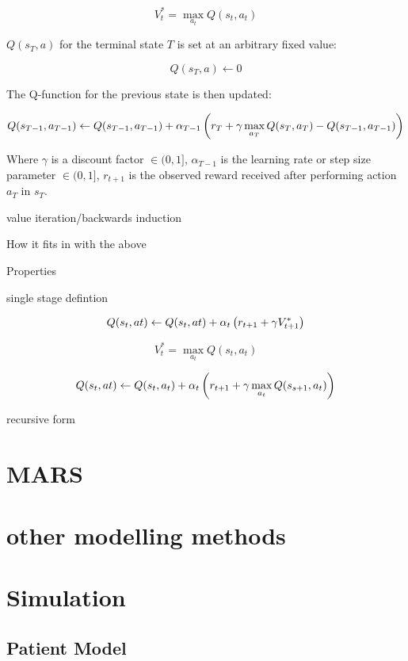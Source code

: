 \documentclass[12pt]{article}
\begin{document}
\[
  V^{*}_{t} = \max_{a_{t}} Q(s_{t}, a_{t})
\]

$Q(s_{T}, a)$ for the terminal state $T$ is set at an arbitrary fixed value:

\[
  Q(s_{T}, a) \gets 0
\]

The Q-function for the previous state is then updated:

\[
Q(s_{T-1}, a_{T-1}) \gets Q(s_{T-1}, a_{T-1}) + \alpha_{T-1} \del{r_{T} + \gamma  \max_{a_{T}} Q(s_{T}, a_{T}) - Q(s_{T-1}, a_{T-1})}
\]

Where $\gamma$ is a discount factor $\in (0, 1]$, $\alpha_{T-1}$ is the learning rate or step size parameter $\in (0, 1]$, $r_{t+1}$ is the observed reward received after performing action $a_{T}$ in $s_{T}$. 

value iteration/backwards induction

How it fits in with the above

Properties

single stage defintion

\[
Q(s_{t}, a{t}) \gets Q(s_{t}, a{t}) + \alpha_{t} \del{r_{t+1} + \gamma V^{*}_{t + 1}}
\]

\[
V^{*}_{t} = \max_{a_{t}} Q(s_{t}, a_{t})
\]

\[
Q(s_{t}, a{t}) \gets Q(s_{t}, a_{t}) + \alpha_{t} \del{r_{t+1} + \gamma \max_{a_{t}} Q(s_{s + 1}, a_{t})}
\]

recursive form




\section{MARS} %
\label{sec:mars}


\section{other modelling methods} %
\label{sec:other_modelling_methods}


\section{Simulation}

\subsection{Patient Model} %
\label{sub:vpm}
\end{document}
